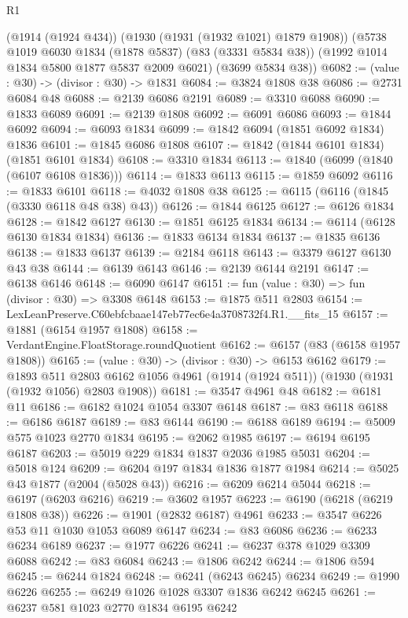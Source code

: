 \begin{lexlean}{R1}
\begin{coremodule}
    (@1914 (@1924 @434))
    (@1930 (@1931 (@1932 @1021) @1879 @1908))
    (@5738
      @1019
      @6030
      @1834
      (@1878 @5837)
      (@83 (@3331 @5834 @38))
      (@1992 @1014 @1834 @5800 @1877 @5837 @2009 @6021)
      (@3699 @5834 @38))
@6082 := (value : @30) -> (divisor : @30) -> @1831
@6084 := @3824 @1808 @38
@6086 := @2731 @6084 @48
@6088 := @2139 @6086 @2191
@6089 := @3310 @6088
@6090 := @1833 @6089
@6091 := @2139 @1808
@6092 := @6091 @6086
@6093 := @1844 @6092
@6094 := @6093 @1834
@6099 := @1842 @6094 (@1851 @6092 @1834) @1836
@6101 := @1845 @6086 @1808
@6107 := @1842 (@1844 @6101 @1834) (@1851 @6101 @1834)
@6108 := @3310 @1834
@6113 := @1840 (@6099 (@1840 (@6107 @6108 @1836)))
@6114 := @1833 @6113
@6115 := @1859 @6092
@6116 := @1833 @6101
@6118 := @4032 @1808 @38
@6125 := @6115 (@6116 (@1845 (@3330 @6118 @48 @38) @43))
@6126 := @1844 @6125
@6127 := @6126 @1834
@6128 := @1842 @6127
@6130 := @1851 @6125 @1834
@6134 := @6114 (@6128 @6130 @1834 @1834)
@6136 := @1833 @6134 @1834
@6137 := @1835 @6136
@6138 := @1833 @6137
@6139 := @2184 @6118
@6143 := @3379 @6127 @6130 @43 @38
@6144 := @6139 @6143
@6146 := @2139 @6144 @2191
@6147 := @6138 @6146
@6148 := @6090 @6147
@6151 := fun (value : @30) => fun (divisor : @30) => @3308 @6148
@6153 := @1875 @511 @2803
@6154 := LexLeanPreserve.C60ebfcbaae147eb77ec6e4a3708732f4.R1.__fits_15
@6157 := @1881 (@6154 @1957 @1808)
@6158 := VerdantEngine.FloatStorage.roundQuotient
@6162 := @6157 (@83 (@6158 @1957 @1808))
@6165 := (value : @30) -> (divisor : @30) -> @6153 @6162
@6179 := @1893
    @511
    @2803
    @6162
    @1056
    @4961
    (@1914 (@1924 @511))
    (@1930 (@1931 (@1932 @1056) @2803 @1908))
@6181 := @3547 @4961 @48
@6182 := @6181 @11
@6186 := @6182 @1024 @1054 @3307 @6148
@6187 := @83 @6118
@6188 := @6186 @6187
@6189 := @83 @6144
@6190 := @6188 @6189
@6194 := @5009 @575 @1023 @2770 @1834
@6195 := @2062 @1985
@6197 := @6194 @6195 @6187
@6203 := @5019 @229 @1834 @1837 @2036 @1985 @5031
@6204 := @5018 @124
@6209 := @6204 @197 @1834 @1836 @1877 @1984
@6214 := @5025 @43 @1877 (@2004 (@5028 @43))
@6216 := @6209 @6214 @5044
@6218 := @6197 (@6203 @6216)
@6219 := @3602 @1957
@6223 := @6190 (@6218 (@6219 @1808 @38))
@6226 := @1901 (@2832 @6187) @4961
@6233 := @3547 @6226 @53 @11 @1030 @1053 @6089 @6147
@6234 := @83 @6086
@6236 := @6233 @6234 @6189
@6237 := @1977 @6226
@6241 := @6237 @378 @1029 @3309 @6088
@6242 := @83 @6084
@6243 := @1806 @6242
@6244 := @1806 @594
@6245 := @6244 @1824
@6248 := @6241 (@6243 @6245) @6234
@6249 := @1990 @6226
@6255 := @6249 @1026 @1028 @3307 @1836 @6242 @6245
@6261 := @6237 @581 @1023 @2770 @1834 @6195 @6242

\end{coremodule}
\end{lexlean}
